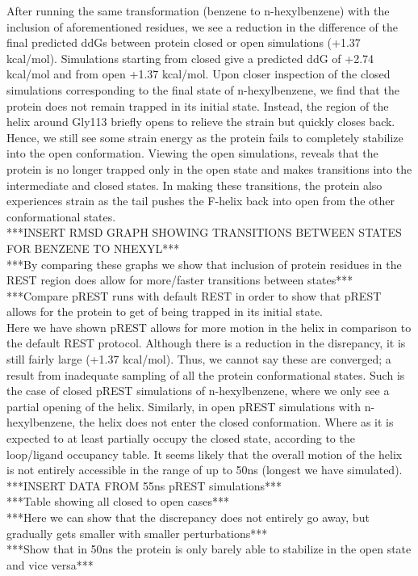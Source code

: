 \documentclass{article}
\begin{document}
After running the same transformation (benzene to n-hexylbenzene) with the inclusion of aforementioned residues, we see a reduction in the difference of the final predicted ddGs between protein closed or open simulations (+1.37 kcal/mol).
Simulations starting from closed give a predicted ddG of +2.74 kcal/mol and from open +1.37 kcal/mol.
Upon closer inspection of the closed simulations corresponding to the final state of n-hexylbenzene, we find that the protein does not remain trapped in its initial state.
Instead, the region of the helix around Gly113 briefly opens to relieve the strain but quickly closes back. 
Hence, we still see some strain energy as the protein fails to completely stabilize into the open conformation.
Viewing the open simulations, reveals that the protein is no longer trapped only in the open state and makes transitions into the intermediate and closed states.
In making these transitions, the protein also experiences strain as the tail pushes the F-helix back into open from the other conformational states.\\

***INSERT RMSD GRAPH SHOWING TRANSITIONS BETWEEN STATES FOR BENZENE TO NHEXYL***\\
***By comparing these graphs we show that inclusion of protein residues in the REST region does allow for more/faster transitions between states***\\
***Compare pREST runs with default REST in order to show that pREST allows for the protein to get of being trapped in its initial state.\\

Here we have shown pREST allows for more motion in the helix in comparison to the default REST protocol.
Although there is a reduction in the disrepancy, it is still fairly large (+1.37 kcal/mol).
Thus, we cannot say these are converged; a result from inadequate sampling of all the protein conformational states.
Such is the case of closed pREST simulations of n-hexylbenzene, where we only see a partial opening of the helix.
Similarly, in open pREST simulations with n-hexylbenzene, the helix does not enter the closed conformation.
Where as it is expected to at least partially occupy the closed state, according to the loop/ligand occupancy table.
It seems likely that the overall motion of the helix is not entirely accessible in the range of up to 50ns (longest we have simulated).\\

***INSERT DATA FROM 55ns pREST simulations***\\
***Table showing all closed to open cases***\\
***Here we can show that the discrepancy does not entirely go away, but gradually gets smaller with smaller perturbations***\\
***Show that in 50ns the protein is only barely able to stabilize in the open state and vice versa***\\
\end{document}
